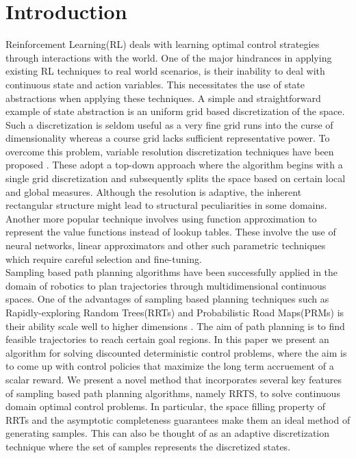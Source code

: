 \documentclass[wcp]{jmlr}
\begin{document}
\section{Introduction}
Reinforcement Learning(RL) deals with learning optimal control strategies through interactions with the world. One of the major hindrances in applying existing RL techniques to real world scenarios, is their inability to deal with continuous state and action variables. This necessitates the use of state abstractions when applying these techniques. A  simple and straightforward example of state abstraction is an uniform grid based discretization of the space. Such a discretization is seldom useful as a very fine grid runs into the curse of dimensionality whereas a course grid lacks sufficient representative power. To overcome this problem, variable resolution discretization techniques have been proposed \citep{munosvariablehigh,partigame}. These adopt a top-down approach where the algorithm begins with a single grid discretization and subsequently splits the space based on certain local and global measures. Although the resolution is adaptive, the inherent rectangular structure might lead to structural peculiarities in some domains. Another more popular technique involves using function approximation to represent the value functions instead of lookup tables. These involve the use of neural networks, linear approximators and other such  parametric techniques which require careful selection and fine-tuning.\\
 Sampling based path planning algorithms have been successfully applied in the domain of robotics to plan trajectories through multidimensional continuous spaces. One of the advantages of sampling based planning techniques such as Rapidly-exploring Random Trees(RRTs) and Probabilistic Road Maps(PRMs) is their ability scale well to higher dimensions \citep{rrt}. The aim of path planning is to find feasible trajectories to reach certain goal regions. In this paper we present an algorithm for solving discounted deterministic control problems, where the aim is to come up with control policies that maximize the long term accruement of a scalar reward. We present a novel method that incorporates several key features of sampling based path planning algorithms, namely RRTS, to solve continuous domain optimal control problems. In particular, the space filling property of RRTs and the asymptotic completeness guarantees make them an ideal method of generating samples. This can also be thought of as an adaptive discretization technique where the set of samples represents the discretized states.
\end{document}
